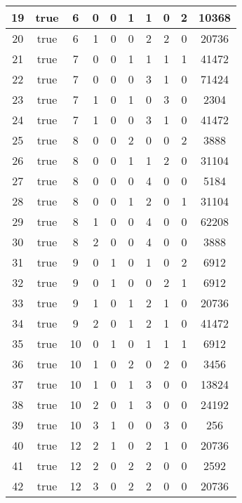 \begin{frame}
{{\begin{tabular}{|c|c|c|c|c|c|c|c|c|c|}
				\hline
				19 & true & 6 & 0 &  0 &  1 &  1 &  0 &  2 & 10368\\
				\hline
				20 & true & 6 & 1 &  0 &  0 &  2 &  2 &  0 & 20736\\
				\hline
				21 & true & 7 & 0 &  0 &  1 &  1 &  1 &  1 & 41472\\
				\hline
				22 & true & 7 & 0 &  0 &  0 &  3 &  1 &  0 & 71424\\
				\hline
				23 & true & 7 & 1 &  0 &  1 &  0 &  3 &  0 & 2304\\
				\hline
				24 & true & 7 & 1 &  0 &  0 &  3 &  1 &  0 & 41472\\
				\hline
				25 & true & 8 & 0 &  0 &  2 &  0 &  0 &  2 & 3888\\
				\hline
				26 & true & 8 & 0 &  0 &  1 &  1 &  2 &  0 & 31104\\
				\hline
				27 & true & 8 & 0 &  0 &  0 &  4 &  0 &  0 & 5184\\
				\hline
				28 & true & 8 & 0 &  0 &  1 &  2 &  0 &  1 & 31104\\
				\hline
				29 & true & 8 & 1 &  0 &  0 &  4 &  0 &  0 & 62208\\
				\hline
				30 & true & 8 & 2 &  0 &  0 &  4 &  0 &  0 & 3888\\
				\hline
				31 & true & 9 & 0 &  1 &  0 &  1 &  0 &  2 & 6912\\
				\hline
				32 & true & 9 & 0 &  1 &  0 &  0 &  2 &  1 & 6912\\
				\hline
				33 & true & 9 & 1 &  0 &  1 &  2 &  1 &  0 & 20736\\
				\hline
				34 & true & 9 & 2 &  0 &  1 &  2 &  1 &  0 & 41472\\
				\hline
				35 & true & 10 & 0 &  1 &  0 &  1 &  1 &  1 & 6912\\
				\hline
				36 & true & 10 & 1 &  0 &  2 &  0 &  2 &  0 & 3456\\
				\hline
				37 & true & 10 & 1 &  0 &  1 &  3 &  0 &  0 & 13824\\
				\hline
				38 & true & 10 & 2 &  0 &  1 &  3 &  0 &  0 & 24192\\
				\hline
				39 & true & 10 & 3 &  1 &  0 &  0 &  3 &  0 & 256\\
				\hline
				40 & true & 12 & 2 &  1 &  0 &  2 &  1 &  0 & 20736\\
				\hline
				41 & true & 12 & 2 &  0 &  2 &  2 &  0 &  0 & 2592\\
				\hline
				42 & true & 12 & 3 &  0 &  2 &  2 &  0 &  0 & 20736\\
				\hline

\end{tabular}}}
\end{frame}
